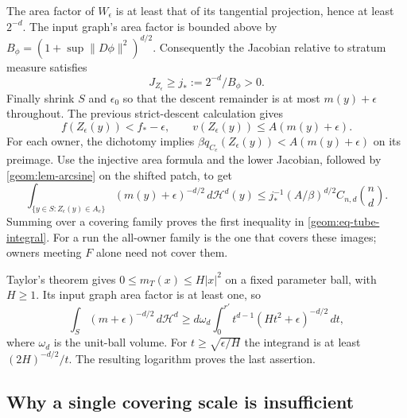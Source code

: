 The area factor of $W_\epsilon$ is at least that of its tangential
projection, hence at least $2^{-d}$. The input graph's area factor is
bounded above by $B_\phi=(1+\sup\|D\phi\|^2)^{d/2}$.
Consequently the Jacobian relative to stratum measure satisfies
\[
 J_{Z_\epsilon}\geq j_*:=2^{-d}/B_\phi>0.
\]
Finally shrink $S$ and $\epsilon_0$ so that the descent remainder is
at most $m(y)+\epsilon$ throughout. The previous strict-descent
calculation gives
\[
 f(Z_\epsilon(y))<f_*-\epsilon,
              \qquad v(Z_\epsilon(y))\leq A(m(y)+\epsilon).
\]
For each owner, the dichotomy implies
$\beta q_{C_e}(Z_\epsilon(y))<A(m(y)+\epsilon)$ on its preimage.
Use the injective area formula and the lower Jacobian, followed by
\cref{geom:lem-arcsine} on the shifted patch, to get
\[
 \int_{\{y\in S:Z_\epsilon(y)\in A_e\}}
        (m(y)+\epsilon)^{-d/2}\,d\mathcal H^d(y)
 \leq j_*^{-1}(A/\beta)^{d/2}C_{n,d}\binom nd.
\]
Summing over a covering family proves the first inequality in
\cref{geom:eq-tube-integral}. For a run the all-owner family is the
one that covers these images; owners meeting $F$ alone need not cover
them.

Taylor's theorem gives $0\leq m_T(x)\leq H|x|^2$ on a fixed parameter
ball, with $H\geq1$. Its input graph area factor is at least one, so
\[
 \int_S(m+\epsilon)^{-d/2}\,d\mathcal H^d
 \geq d\omega_d\int_0^{r'}
          t^{d-1}(Ht^2+\epsilon)^{-d/2}\,dt,
\]
where $\omega_d$ is the unit-ball volume. For
$t\geq\sqrt{\epsilon/H}$ the integrand is at least
$(2H)^{-d/2}/t$. The resulting logarithm proves the last assertion.

\subsection{Why a single covering scale is insufficient}


